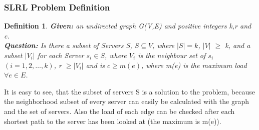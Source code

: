 \documentclass [12pt]{article}
\newtheorem{mydef}{Definition}
\begin{document}
\subsubsection{SLRL Problem Definition}

\begin{mydef}
  {\itshape \textbf{Given:} an undirected graph G(V,E) and  positive integers k,r and c.\\
    \textbf{Question:} 
    Is there a subset of Servers S, $S \subseteq V$, where $|S| = k$, $|V|$ $\geq$ k,
    and a subset $|V_i|$ for each Server $s_i \in S$, where $V_i$ is the neighbour set of $s_i$ $(i=1,2,\dots,k)$, r $\geq  |V_i|$ 
  and is $c \geq m(e)$, where m(e) is the maximum load $\forall e \in E$.} 

\end{mydef}

It is easy to see, that the subset of servers S is a solution to the problem, because the neighborhood subset
of every server can easily be calculated with the graph and the set of servers. Also the load of each edge
can be checked after each shortest path to the server has been looked at (the maximum is m(e)).
\end{document}
